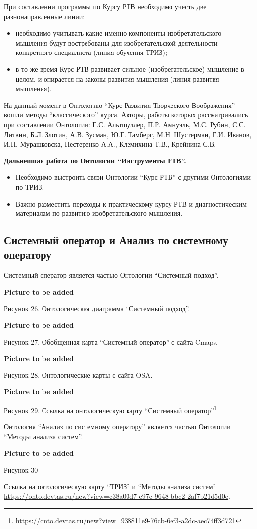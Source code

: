 \documentclass[11pt,a4paper]{article}
\newcommand{\addpicture}{\textbf{Picture to be added}\par}
\begin{document}
При
составлении программы по Курсу РТВ необходимо учесть две разнонаправленные
линии:
\begin{itemize}
\item необходимо учитывать какие именно компоненты изобретательского мышления
  будут востребованы для изобретательской деятельности конкретного специалиста
  (линия обучения ТРИЗ);
\item в то же время Курс РТВ развивает сильное (изобретательское) мышление в
  целом, и опирается на законы развития мышления (линия развития мышления).
\end{itemize}
На данный момент в Онтологию “Курс Развития Творческого Воображения” вошли
методы “классического” курса. Авторы, работы которых рассматривались при
составлении Онтологии: Г.С. Альтшуллер, П.Р. Амнуэль, М.С. Рубин, С.С. Литвин,
Б.Л.  Злотин, А.В. Зусман, Ю.Г. Тамберг, М.Н. Шустерман, Г.И. Иванов,
И.Н. Мурашковска, Нестеренко А.А., Клемихина Т.В., Крейнина С.В.

\textbf{Дальнейшая работа по Онтологии “Инструменты РТВ”.}
\begin{itemize}
\item Необходимо выстроить связи Онтологии “Курс РТВ” с другими Онтологиями по
  ТРИЗ.
\item Важно разместить переходы к практическому курсу РТВ и диагностическим
  материалам по развитию изобретательского мышления.
\end{itemize}

\subsection{Системный оператор и Анализ по системному оператору}

Системный оператор является частью Онтологии “Системный подход”.
\begin{center}
  \addpicture
  Рисунок 26. Онтологическая диаграмма “Системный подход”.
\end{center}
\begin{center}
  \addpicture
  Рисунок 27. Обобщенная карта “Системный оператор” с сайта Cmaps.
\end{center}
\begin{center}
  \addpicture
  Рисунок 28. Онтологические карты с сайта OSA.
\end{center}
\begin{center}
  \addpicture
  Рисунок 29.  Ссылка на онтологическую карту “Системный
  оператор”\footnote{\url{https://onto.devtas.ru/new?view=938811e9-76cb-6ef3-a2dc-aec74ff3d721}}
\end{center}
Онтология “Анализ по системному оператору” является частью Онтологии “Методы
анализа систем”.
\begin{center}
  \addpicture
  Рисунок 30
\end{center}
Ссылка на онтологическую карту “ТРИЗ” и “Методы анализа систем”
\url{https://onto.devtas.ru/new?view=c38a00d7-e97c-9648-bbc2-2af7b21d5d0e}.
\end{document}
